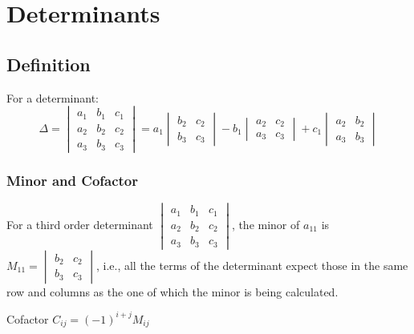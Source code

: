 \chapter{Determinants}
\section{Definition}
For a determinant:
\begin{equation}
	\Delta=\begin{vmatrix}
		a_1&b_1&c_1\\
		a_2&b_2&c_2\\
		a_3&b_3&c_3
	\end{vmatrix}=a_1\begin{vmatrix}b_2&c_2\\b_3&c_3\end{vmatrix}-b_1\begin{vmatrix}a_2&c_2\\a_3&c_3\end{vmatrix}+c_1\begin{vmatrix}a_2&b_2\\a_3&b_3\end{vmatrix}
\end{equation}

\subsection{Minor and Cofactor}
For a third order determinant
$\begin{vmatrix}
	a_1&b_1&c_1\\
	a_2&b_2&c_2\\
	a_3&b_3&c_3
\end{vmatrix}$, the minor of $a_{11}$ is $M_{11}=\begin{vmatrix}b_2&c_2\\b_3&c_3\end{vmatrix}$, i.e., all the terms of the determinant expect those in the same row and columns as the one of which the minor is being calculated.

Cofactor $C_{ij}=(-1)^{i+j} M_{ij}$


